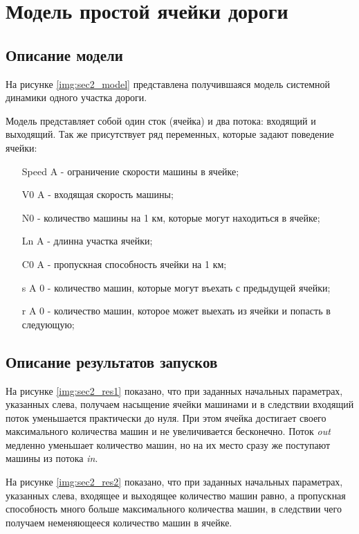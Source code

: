 \section{Модель простой ячейки дороги}

\subsection{Описание модели}

На рисунке \ref{img:sec2_model} представлена получившаяся модель системной динамики одного участка дороги.

Модель представляет собой один сток (ячейка) и два потока: входящий и выходящий.
Так же присутствует ряд переменных, которые задают поведение ячейки:
\begin{itemize}
    \item[Speed A] - ограничение скорости машины в ячейке;
    \item[V0 A] - входящая скорость машины;
    \item[N0] - количество машины на 1 км, которые могут находиться в ячейке;
    \item[Ln A] - длинна участка ячейки;
    \item[C0 A] - пропускная способность ячейки на 1 км;
    \item[s A 0] - количество машин, которые могут въехать с предыдущей ячейки;
    \item[r A 0] - количество машин, которое может выехать из ячейки и попасть в следующую;
\end{itemize}


\subsection{Описание результатов запусков}

На рисунке \ref{img:sec2_res1} показано, что при заданных начальных параметрах, указанных слева, получаем насыщение ячейки машинами и в следствии входящий поток уменьшается практически до нуля. При этом ячейка достигает своего максимального количества машин и не увеличивается бесконечно. Поток \textit{out} медленно уменьшает количество машин, но на их место сразу же поступают машины из потока \textit{in}.


На рисунке \ref{img:sec2_res2} показано, что при заданных начальных параметрах, указанных слева, входящее и выходящее количество машин равно, а пропускная способность много больше максимального количества машин, в следствии чего получаем неменяющееся количество машин в ячейке.

